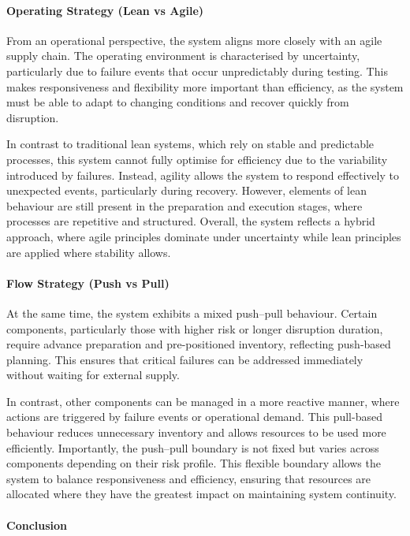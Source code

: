 \documentclass[11pt, a4paper]{report}
\numberwithin{equation}{section}
\begin{document}
\paragraph{Operating Strategy (Lean vs Agile)}

From an operational perspective, the system aligns more closely with an agile supply chain. The operating environment is characterised by uncertainty, particularly due to failure events that occur unpredictably during testing. This makes responsiveness and flexibility more important than efficiency, as the system must be able to adapt to changing conditions and recover quickly from disruption.

In contrast to traditional lean systems, which rely on stable and predictable processes, this system cannot fully optimise for efficiency due to the variability introduced by failures. Instead, agility allows the system to respond effectively to unexpected events, particularly during recovery. However, elements of lean behaviour are still present in the preparation and execution stages, where processes are repetitive and structured. Overall, the system reflects a hybrid approach, where agile principles dominate under uncertainty while lean principles are applied where stability allows.

\paragraph{Flow Strategy (Push vs Pull)}

At the same time, the system exhibits a mixed push--pull behaviour. Certain components, particularly those with higher risk or longer disruption duration, require advance preparation and pre-positioned inventory, reflecting push-based planning. This ensures that critical failures can be addressed immediately without waiting for external supply.

In contrast, other components can be managed in a more reactive manner, where actions are triggered by failure events or operational demand. This pull-based behaviour reduces unnecessary inventory and allows resources to be used more efficiently. Importantly, the push--pull boundary is not fixed but varies across components depending on their risk profile. This flexible boundary allows the system to balance responsiveness and efficiency, ensuring that resources are allocated where they have the greatest impact on maintaining system continuity.

\paragraph{Conclusion}
\end{document}
